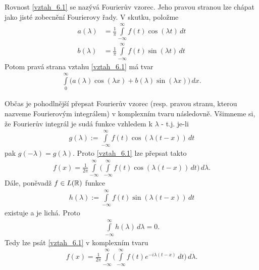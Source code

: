 \begin{poznamka}
\label{p_6.5}
Rovnost \eqref{vztah_6.1} se nazývá Fourier\r uv vzorec. Jeho pravou stranou lze chápat jako jisté zobecnění Fourierovy řady. V skutku, položme 
\begin{align*}
a(\lambda)&=\frac{1}{\pi}\int \limits _{-\infty}^{\infty} f(t) \cos(\lambda t) \, dt \\
b(\lambda)&=\frac{1}{\pi}\int \limits _{-\infty}^{\infty} f(t) \sin(\lambda t) \, dt 
\end{align*}
Potom pravá strana vztahu \eqref{vztah_6.1} má tvar 
\begin{align*}
\int \limits _{0}^{\infty} \Big(a(\lambda)\cos(\lambda x)+b(\lambda)\sin(\lambda x)\Big) \, dx.
\end{align*}
\end{poznamka}
\begin{poznamka}
Občas je pohodlnější přepsat Fourier\r uv vzorec (resp. pravou stranu, kterou nazveme Fourierovým integrálem) v komplexním tvaru následovně. Všimneme si, že Fourier\r uv integrál je sudá funkce vzhledem k $\lambda$ - t.j. je-li
\begin{align*}
g(\lambda):=\int \limits _{-\infty}^{\infty} f(t) \cos (\lambda (t-x) ) \, dt
\end{align*}
pak $g(-\lambda)=g(\lambda)$. Proto \eqref{vztah_6.1} lze přepsat takto
\begin{align*}
f(x)=\frac{1}{2\pi}\int \limits _{-\infty}^{\infty} \Big(\int \limits _{-\infty}^{\infty} f(t) \cos (\lambda (t-x)) \, dt \Big) \, d\lambda.
\end{align*}
Dále, poněvadž $f \in L(\mathbb{R})$ funkce 
\begin{align*}
h(\lambda):= \int \limits _{-\infty}^{\infty} f(t) \sin(\lambda (t-x)) \, dt
\end{align*}
existuje a je lichá. Proto
\begin{align*}
\int \limits _{-\infty}^{\infty} h(\lambda) \, d\lambda = 0.
\end{align*}
Tedy lze psát \eqref{vztah_6.1} v komplexním tvaru
\begin{align*}
f(x)=\frac{1}{2\pi}\int \limits _{-\infty}^{\infty} \Big(\int \limits _{-\infty}^{\infty} f(t) e^{-i\lambda (t-x)}\, dt \Big)\, d\lambda.
\end{align*}
\end{poznamka}



